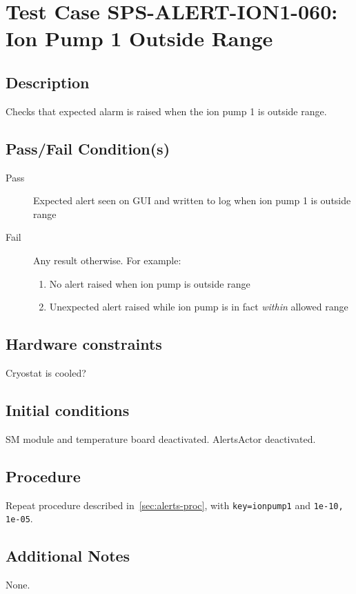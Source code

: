 \section{Test Case SPS-ALERT-ION1-060: Ion Pump 1 Outside Range}

\subsection{Description}

Checks that expected alarm is raised when the ion pump 1 is outside range.

\subsection{Pass/Fail Condition(s)}

\begin{description}
\item [Pass] Expected alert seen on GUI and written to log when ion pump 1 is outside range
\item [Fail] Any result otherwise. For example:

\begin{enumerate}
    \item No alert raised when ion pump is outside range
    \item Unexpected alert raised while ion pump is in fact {\it within} allowed range
\end{enumerate}
\end{description}

\subsection{Hardware constraints}

Cryostat is cooled?

\subsection{Initial conditions}

SM module and temperature board deactivated. AlertsActor deactivated.

\subsection{Procedure}

Repeat procedure described in~\ref{sec:alerts-proc}, with \texttt{key=ionpump1} and \texttt{1e-10, 1e-05}.

\subsection{Additional Notes}
None.
